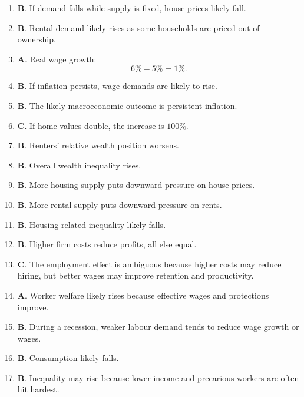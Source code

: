 \documentclass[12pt]{article}
\begin{document}
\begin{enumerate}
\item \textbf{B}. If demand falls while supply is fixed, house prices likely fall.

\item \textbf{B}. Rental demand likely rises as some households are priced out of ownership.

\item \textbf{A}. Real wage growth:
\[
6\%-5\%=1\%.
\]

\item \textbf{B}. If inflation persists, wage demands are likely to rise.

\item \textbf{B}. The likely macroeconomic outcome is persistent inflation.

\item \textbf{C}. If home values double, the increase is \(100\%\).

\item \textbf{B}. Renters' relative wealth position worsens.

\item \textbf{B}. Overall wealth inequality rises.

\item \textbf{B}. More housing supply puts downward pressure on house prices.

\item \textbf{B}. More rental supply puts downward pressure on rents.

\item \textbf{B}. Housing-related inequality likely falls.

\item \textbf{B}. Higher firm costs reduce profits, all else equal.

\item \textbf{C}. The employment effect is ambiguous because higher costs may reduce hiring, but better wages may improve retention and productivity.

\item \textbf{A}. Worker welfare likely rises because effective wages and protections improve.

\item \textbf{B}. During a recession, weaker labour demand tends to reduce wage growth or wages.

\item \textbf{B}. Consumption likely falls.

\item \textbf{B}. Inequality may rise because lower-income and precarious workers are often hit hardest.


\end{enumerate}
\end{document}
